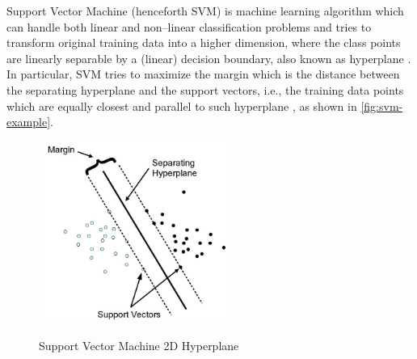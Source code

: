 Support Vector Machine (henceforth SVM) is machine learning algorithm which can handle both linear and non--linear classification problems and tries to transform original training data into a higher dimension, where the class points are linearly separable by a (linear) decision boundary, also known as hyperplane \citep{han2011data}.
In particular, SVM tries to maximize the margin which is the distance between the separating hyperplane and the support vectors, i.e., the training data points which are equally closest and parallel to such hyperplane \citep{tatsat2020machine}, as shown in \autoref{fig:svm-example}.

\begin{figure}[H]
    \centering
    \caption{Support Vector Machine 2D Hyperplane}\vspace{0.5em}
    \label{fig:svm-example}\
    \includegraphics[width=60mm]{Figures/svmhyperplane.jpg}

    \vspace{-1em}
\end{figure}

